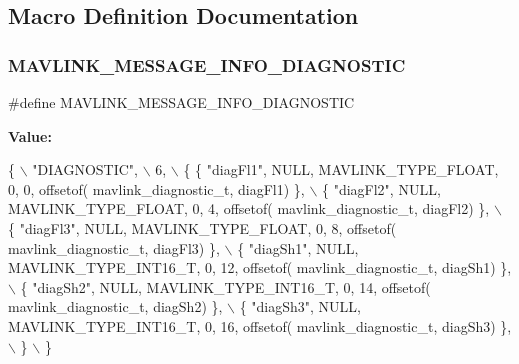 \subsection{Macro Definition Documentation}
\mbox{\label{mavlink__msg__diagnostic_8h_a6a39c199bc81fa96cea7a3306e9838c5}} 
\subsubsection{M\+A\+V\+L\+I\+N\+K\+\_\+\+M\+E\+S\+S\+A\+G\+E\+\_\+\+I\+N\+F\+O\+\_\+\+D\+I\+A\+G\+N\+O\+S\+T\+IC}
{\footnotesize\ttfamily \#define M\+A\+V\+L\+I\+N\+K\+\_\+\+M\+E\+S\+S\+A\+G\+E\+\_\+\+I\+N\+F\+O\+\_\+\+D\+I\+A\+G\+N\+O\+S\+T\+IC}

{\bfseries Value\+:}
\begin{DoxyCode}
\{ \(\backslash\)
    \textcolor{stringliteral}{"DIAGNOSTIC"}, \(\backslash\)
    6, \(\backslash\)
    \{  \{ \textcolor{stringliteral}{"diagFl1"}, NULL, MAVLINK_TYPE_FLOAT, 0, 0, offsetof(
      mavlink_diagnostic_t, diagFl1) \}, \(\backslash\)
         \{ \textcolor{stringliteral}{"diagFl2"}, NULL, MAVLINK_TYPE_FLOAT, 0, 4, offsetof(
      mavlink_diagnostic_t, diagFl2) \}, \(\backslash\)
         \{ \textcolor{stringliteral}{"diagFl3"}, NULL, MAVLINK_TYPE_FLOAT, 0, 8, offsetof(
      mavlink_diagnostic_t, diagFl3) \}, \(\backslash\)
         \{ \textcolor{stringliteral}{"diagSh1"}, NULL, MAVLINK_TYPE_INT16_T, 0, 12, offsetof(
      mavlink_diagnostic_t, diagSh1) \}, \(\backslash\)
         \{ \textcolor{stringliteral}{"diagSh2"}, NULL, MAVLINK_TYPE_INT16_T, 0, 14, offsetof(
      mavlink_diagnostic_t, diagSh2) \}, \(\backslash\)
         \{ \textcolor{stringliteral}{"diagSh3"}, NULL, MAVLINK_TYPE_INT16_T, 0, 16, offsetof(
      mavlink_diagnostic_t, diagSh3) \}, \(\backslash\)
         \} \(\backslash\)
\}
\end{DoxyCode}
\mbox{\label{mavlink__msg__diagnostic_8h_a1733f35307f9be83006eaad59329c881}} 
